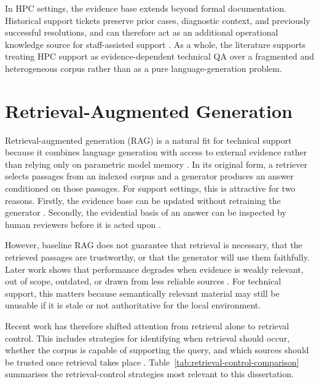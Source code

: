 In \ac{HPC} settings, the evidence base extends beyond formal documentation. Historical support tickets preserve prior cases, diagnostic context, and previously successful resolutions, and can therefore act as an additional operational knowledge source for staff-assisted support \citep{rodenbeckTicketHubEnablingActionable2023,joslinGeneratingFrequentlyAsked2025}. As a whole, the literature supports treating \ac{HPC} support as evidence-dependent technical \ac{QA} over a fragmented and heterogeneous corpus rather than as a pure language-generation problem. 

\section{Retrieval-Augmented Generation}
\label{sec:rag}

Retrieval-augmented generation (\ac{RAG}) is a natural fit for technical support because it combines language generation with access to external evidence rather than relying only on parametric model memory \citep{lewisRetrievalaugmentedGenerationKnowledgeintensive2020}. In its original form, a retriever selects passages from an indexed corpus and a generator produces an answer conditioned on those passages. For support settings, this is attractive for two reasons. Firstly, the evidence base can be updated without retraining the generator \citep{lewisRetrievalaugmentedGenerationKnowledgeintensive2020}. Secondly, the evidential basis of an answer can be inspected by human reviewers before it is acted upon \citep{shusterRetrievalAugmentationReduces2021}. 

However, baseline \ac{RAG} does not guarantee that retrieval is necessary, that the retrieved passages are trustworthy, or that the generator will use them faithfully. Later work shows that performance degrades when evidence is weakly relevant, out of scope, outdated, or drawn from less reliable sources \citep{asaiSelfRAGLearningRetrieve2023,liYouKnowWhat2024,hwangRetrievalAugmentedGenerationEstimation2025}. For technical support, this matters because semantically relevant material may still be unusable if it is stale or not authoritative for the local environment. 

Recent work has therefore shifted attention from retrieval alone to retrieval control. This includes strategies for identifying when retrieval should occur, whether the corpus is capable of supporting the query, and which sources should be trusted once retrieval takes place \citep{asaiSelfRAGLearningRetrieve2023,liYouKnowWhat2024,hwangRetrievalAugmentedGenerationEstimation2025}. Table~\ref{tab:retrieval-control-comparison} summarises the retrieval-control strategies most relevant to this dissertation. 

